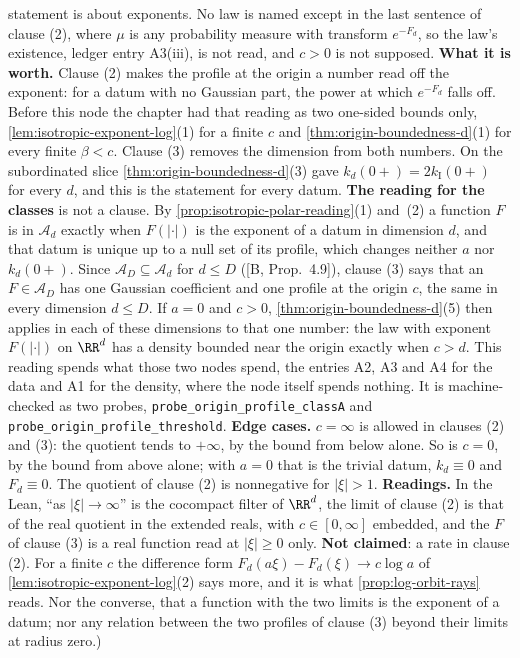 \begin{theorem}
{statement is about exponents. No law is named except in the last sentence of clause (2), where
$\mu$ is any probability measure with transform $e^{-F_d}$, so the law's existence, ledger entry
A3(iii), is not read, and $c > 0$ is not supposed. \textbf{What it is worth.} Clause (2) makes
the profile at the origin a number read off the exponent: for a datum with no Gaussian part, the
power at which $e^{-F_d}$ falls off. Before this node the chapter had that reading as two
one-sided bounds only, \ref{lem:isotropic-exponent-log}(1) for a finite $c$ and
\ref{thm:origin-boundedness-d}(1) for every finite $\beta < c$. Clause (3) removes the dimension
from both numbers. On the subordinated slice \ref{thm:origin-boundedness-d}(3) gave
$k_d(0{+}) = 2k_{\mathrm I}(0{+})$ for every $d$, and this is the statement for every datum.
\textbf{The reading for the classes} is not a clause. By \ref{prop:isotropic-polar-reading}(1)
and~(2) a function $F$ is in $\mathcal{A}_d$ exactly when $F(|\cdot|)$ is the exponent of a datum in
dimension $d$, and that datum is unique up to a null set of its profile, which changes neither $a$
nor $k_d(0{+})$. Since $\mathcal{A}_D \subseteq \mathcal{A}_d$ for $d \le D$ ([B, Prop.~4.9]),
clause (3) says that an $F \in \mathcal{A}_D$ has one Gaussian coefficient and one profile at the
origin $c$, the same in every dimension $d \le D$. If $a = 0$ and $c > 0$,
\ref{thm:origin-boundedness-d}(5) then applies in each of these dimensions to that one number: the
law with exponent $F(|\cdot|)$ on $\RR^d$ has a density bounded near the origin exactly when
$c > d$. This reading spends what those two nodes spend, the entries A2, A3 and A4 for the data and
A1 for the density, where the node itself spends nothing. It is machine-checked as two probes,
\texttt{probe\_origin\_profile\_classA} and \texttt{probe\_origin\_profile\_threshold}.
\textbf{Edge cases.} $c = \infty$ is allowed in clauses (2) and (3): the quotient tends to
$+\infty$, by the bound from below alone. So is $c = 0$, by the bound from above alone; with
$a = 0$ that is the trivial datum, $k_d \equiv 0$ and $F_d \equiv 0$. The quotient of clause (2) is
nonnegative for $|\xi| > 1$. \textbf{Readings.} In the Lean, ``as $|\xi| \to \infty$'' is the
cocompact filter of $\RR^d$, the limit of clause (2) is that of the real quotient in the extended
reals, with $c \in [0,\infty]$ embedded, and the $F$ of clause (3) is a real function read at
$|\xi| \ge 0$ only. \textbf{Not claimed}: a rate in clause (2). For a finite $c$ the difference
form $F_d(a\xi) - F_d(\xi) \to c\log a$ of \ref{lem:isotropic-exponent-log}(2) says more, and it
is what \ref{prop:log-orbit-rays} reads. Nor the converse, that a function with the two limits is
the exponent of a datum; nor any relation between the two profiles of clause (3) beyond their
limits at radius zero.)}
\end{theorem}

